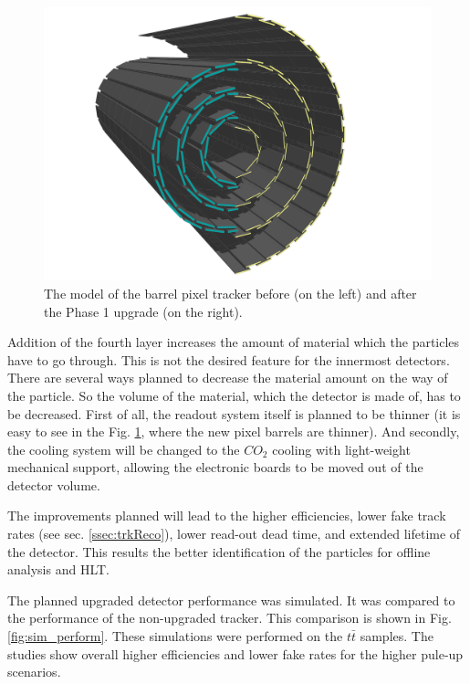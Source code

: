 \begin{figure}[t]
 \centering
 \includegraphics[width=1.0\textwidth]{021_pixel_upgrade/plots/pixel_phase1_4_layers.png}
 \caption{The model of the barrel pixel tracker before (on the left) and after the Phase 1 upgrade (on the right).}
 \label{fig:tracker_4}
\end{figure}

Addition of the fourth layer increases the amount of material which the particles have to go through. This is not
the desired feature for the innermost detectors. There are several ways planned to decrease the material amount on the 
way of the particle. So the volume of the material, which the detector is made of, has to be decreased. 
First of all, the readout system itself is planned to be thinner (it is easy to see in the Fig. \ref{fig:tracker_4},
where the new pixel barrels are thinner). And secondly, the cooling system will be changed to the $CO_{2}$ cooling \cite{CMS:2012sda} with 
light-weight mechanical support, allowing the electronic boards to be moved out of the detector volume.

The improvements planned will lead to the higher efficiencies, lower fake track rates (see sec. \ref{ssec:trkReco}), lower read-out dead time,
and extended lifetime of the detector. This results the better identification of the particles for offline analysis and HLT.

The planned upgraded detector performance was simulated. It was compared to the performance of the non-upgraded tracker. This comparison
is shown in Fig. \ref{fig:sim_perform}. These simulations were performed on the $t\bar{t}$ samples. The studies show overall higher 
efficiencies and lower fake rates for the higher pule-up scenarios.

